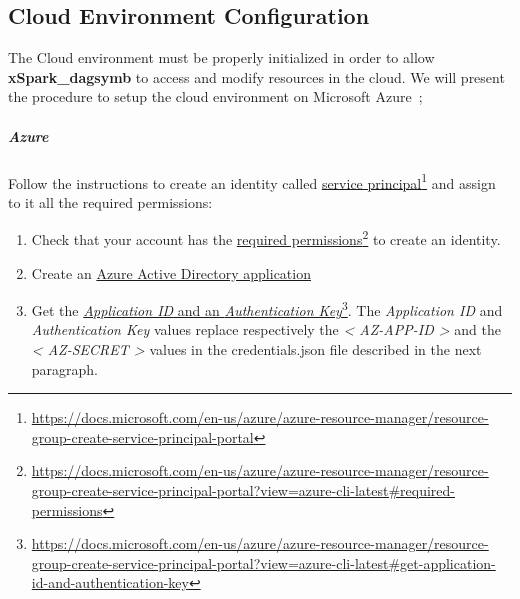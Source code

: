 \hypertarget{cloud-environment-configuration}{%
\subsection{Cloud Environment
	Configuration}\label{cloud-environment-configuration}}

The Cloud environment must be properly initialized in order to allow
\textbf{xSpark\_dagsymb} to access and modify resources in the cloud.
We will present the procedure to setup the cloud environment on Microsoft Azure~\cite{Azure};

\hypertarget{azure}{%
\subparagraph{Azure}\label{azure}}

Follow the instructions to create an identity called
\href{https://docs.microsoft.com/en-us/azure/azure-resource-manager/resource-group-create-service-principal-portal}{service
principal}\footnote{\url{https://docs.microsoft.com/en-us/azure/azure-resource-manager/resource-group-create-service-principal-portal}} and assign to it all the required permissions:

\begin{enumerate}
\def\labelenumi{\arabic{enumi})}
\item
Check that your account has the
\href{https://docs.microsoft.com/en-us/azure/azure-resource-manager/resource-group-create-service-principal-portal?view=azure-cli-latest\#required-permissions}{required permissions}\footnote{\url{https://docs.microsoft.com/en-us/azure/azure-resource-manager/resource-group-create-service-principal-portal?view=azure-cli-latest\#required-permissions}} to create an identity.
\item
Create an
\href{https://docs.microsoft.com/en-us/azure/azure-resource-manager/resource-group-create-service-principal-portal?view=azure-cli-latest\#create-an-azure-active-directory-application}{Azure
	Active Directory application}
\item
Get the
\href{https://docs.microsoft.com/en-us/azure/azure-resource-manager/resource-group-create-service-principal-portal?view=azure-cli-latest\#get-application-id-and-authentication-key}{\emph{Application ID} and an \emph{Authentication Key}}\footnote{\url{https://docs.microsoft.com/en-us/azure/azure-resource-manager/resource-group-create-service-principal-portal?view=azure-cli-latest\#get-application-id-and-authentication-key}}. The \emph{Application ID} and
\emph{Authentication Key} values replace respectively the
\emph{\textless{} AZ-APP-ID \textgreater{}} and the \emph{\textless{}
	AZ-SECRET \textgreater{}} values in the credentials.json file
described in the next paragraph.
\end{enumerate}

